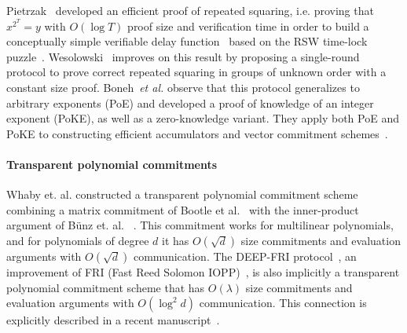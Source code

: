 Pietrzak~\cite{ITCS:Pietrzak18} developed an efficient proof of repeated squaring, i.e. proving that $x^{2^T} = y$ with $O(\log T)$ proof size and verification time in order to build a conceptually simple verifiable delay function~\cite{C:BBBF18} based on the RSW time-lock puzzle~\cite{RivShaWag96}. Wesolowski~\cite{EC:Wesolowski19} improves on this result by proposing a single-round protocol to prove correct repeated squaring in groups of unknown order with a constant size proof. Boneh~\emph{et al.} observe that this protocol generalizes to arbitrary exponents (PoE) and developed a proof of knowledge of an integer exponent (PoKE), as well as a zero-knowledge variant. They apply both PoE and PoKE to constructing efficient accumulators and vector commitment schemes~\cite{C:BonBunFis19}.

\paragraph{Transparent polynomial commitments} 
Whaby et. al. constructed a transparent polynomial commitment scheme combining a matrix commitment of Bootle et al.~\cite{EC:BCCGP16} with the inner-product argument of B\"{u}nz et. al. ~\cite{SP:BBBPWM18}. This commitment works for multilinear polynomials, and for polynomials of degree $d$ it has $O(\sqrt{d})$ size commitments and evaluation arguments with $O(\sqrt{d})$ communication. The DEEP-FRI protocol~\cite{ECCC:BGKS19}, an improvement of FRI (Fast Reed Solomon IOPP)~\cite{ICALP:BBHR18}, is also implicitly a transparent polynomial commitment scheme that has $O(\lambda)$ size commitments and evaluation arguments with $O(\log ^2 d)$ communication. This connection is explicitly described in a recent manuscript~\cite{MatterLabs}. 


